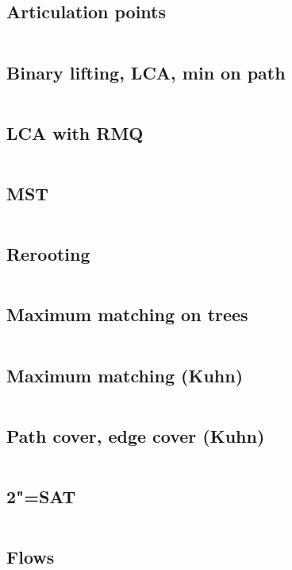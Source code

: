 ﻿\documentclass[10pt,twocolumn,oneside]{article}
\begin{document}
\subsection{Articulation points}
\inputminted[breaklines]{cpp}{Graph algorithms/articulation points.cpp}
\subsection{Binary lifting, LCA, min on path}
\inputminted[breaklines]{cpp}{Graph algorithms/binary lifting + lca + min on path.cpp}
\subsection{LCA with RMQ}
\inputminted[breaklines]{cpp}{Graph algorithms/lca with rmq.cpp}
\subsection{MST}
\inputminted[breaklines]{cpp}{Graph algorithms/mst.cpp}
\subsection{Rerooting}
\inputminted[breaklines]{cpp}{Graph algorithms/rerooting.cpp}
\subsection{Maximum matching on trees}
\inputminted[breaklines]{cpp}{Graph algorithms/maximum matching on trees.cpp}
\subsection{Maximum matching (Kuhn)}
\inputminted[breaklines]{cpp}{Graph algorithms/kuhn (with optimizations).cpp}
\subsection{Path cover, edge cover (Kuhn)}
\inputminted[breaklines]{cpp}{Graph algorithms/path cover + edge cover (kuhn).cpp}
\subsection{2"=SAT}
\inputminted[breaklines]{cpp}{Graph algorithms/2-sat.cpp}
\subsection{Flows}
\inputminted[breaklines]{python}{Graph algorithms/flows.py}
\end{document}

